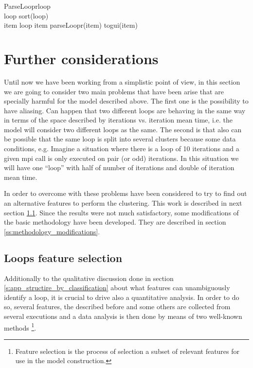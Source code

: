 \begin{pseudocode}{ParseLoopr}{loop}
\label{pc:parse_loop_func}
     \\
    loop \GETS sort(loop) \\

    \FORALL item \in loop \DO
    \BEGIN
        \IF item \in \Upsilon \THEN
            parseLoopr(item)
        \ELSE
            togui(item)
    \END
\end{pseudocode}

\section{Further considerations}

Until now we have been working from a simplistic point of view, in this section
we are going to consider two main problems that have been arise that
are specially harmful for the model described above. The first one is the possibility 
to have aliasing. Can happen 
that two different loops are behaving in the same way in terms of the space
described by iterations vs. iteration mean time, i.e. the model will consider 
two different loops as the same. The second
is that also can be possible that the same loop is split into several clusters
because some data conditions, e.g. Imagine a situation where there is a loop of
10 iterations and a given mpi call is only executed on pair (or odd) iterations.
In this situation we will have one ``loop'' with half of number of iterations
and double of iteration mean time. 

In order to overcome with these problems have been considered to try to find out
an alternative features to perform the clustering. This work is described in
next section \ref{ss:loops_characterzation}. Since the results were not much
satisfactory, some modifications of the basic methodology have been developed.
They are described in section \ref{ss:methodology_modifications}.

\subsection{Loops feature selection}\label{ss:loops_characterzation}

Additionally to the qualitative discussion done in section
\ref{s:app_structire_by_classification} about what features can unambiguously
identify a loop, it is crucial to drive also a 
quantitative analysis. In order to do so, several features, the described 
before and some others are collected from several executions and a data analysis
is then done by means of two well-known methods \footnote{Feature selection is
the process of selection a subset of relevant features for use in the model
construction.}. 

